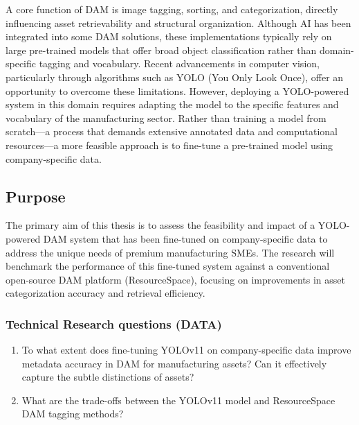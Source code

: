 \documentclass[a4paper,10pt,twocolumn]{article}
\numberwithin{figure}{section}
\numberwithin{table}{section}
\begin{document}
A core function of DAM is image tagging, sorting, and categorization, directly influencing asset 
retrievability and structural organization. Although AI has been integrated into some DAM solutions,
 these implementations typically rely on large pre-trained models that offer broad object classification 
 rather than domain-specific tagging and vocabulary. Recent advancements in computer vision, 
 particularly through algorithms such as YOLO (You Only Look Once), 
offer an opportunity to overcome these limitations. However, deploying a YOLO-powered system in this domain
 requires adapting the model to the specific features and vocabulary of the manufacturing sector. Rather than
  training a model from scratch—a process that demands extensive annotated data and computational resources—a 
  more feasible approach is to fine-tune a pre-trained model using company-specific data. 


\subsection{Purpose}
The primary aim of this thesis is to assess the feasibility and impact of a YOLO-powered DAM system 
that has been fine-tuned on company-specific data to address the unique needs of premium manufacturing SMEs. 
The research will benchmark the performance of this fine-tuned system against a conventional open-source DAM 
platform (ResourceSpace), focusing on improvements in asset categorization accuracy
and retrieval efficiency. 

\vspace{0.3cm}
\subsubsection{Technical Research questions (DATA)}
\vspace{0.3cm}

\begin{enumerate}[label=(\alph*)]
    \item To what extent does fine-tuning YOLOv11 on company-specific data improve metadata accuracy in DAM for manufacturing assets?
    Can it effectively capture the subtle distinctions of assets? 
    
    \item What are the trade-offs between the YOLOv11 model and ResourceSpace DAM tagging methods?
\end{enumerate}
\end{document}
